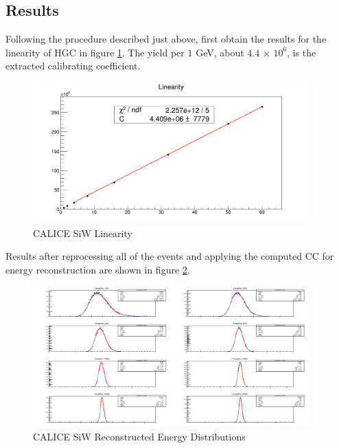 \subsection{Results}
Following the procedure described just above, first obtain the results for the linearity of {\sc HGC} in figure \ref{fig:simulations_hgc_pblinearity}. The yield per $1$ GeV, about $4.4$ $\times$ $10^6$, is the extracted calibrating coefficient.
 \begin{figure}[htbp]
    \centering
    \includegraphics[width=0.95\textwidth]{figures/ch_simulations/hgc/performance/Pb/Linearity.png}
    \caption{{\sc CALICE} SiW Linearity}
    \label{fig:simulations_hgc_pblinearity}
 \end{figure}

Results after reprocessing all of the events and applying the computed CC for energy reconstruction are shown in figure \ref{fig:simulations_hgc_pbenergyreco}.
\begin{figure}[htbp]
    \centering
    \includegraphics[width=0.95\textwidth]{figures/ch_simulations/hgc/performance/Pb/EnergyRECO.png}
    \caption{{\sc CALICE} SiW Reconstructed Energy Distributions}
    \label{fig:simulations_hgc_pbenergyreco}
 \end{figure}

